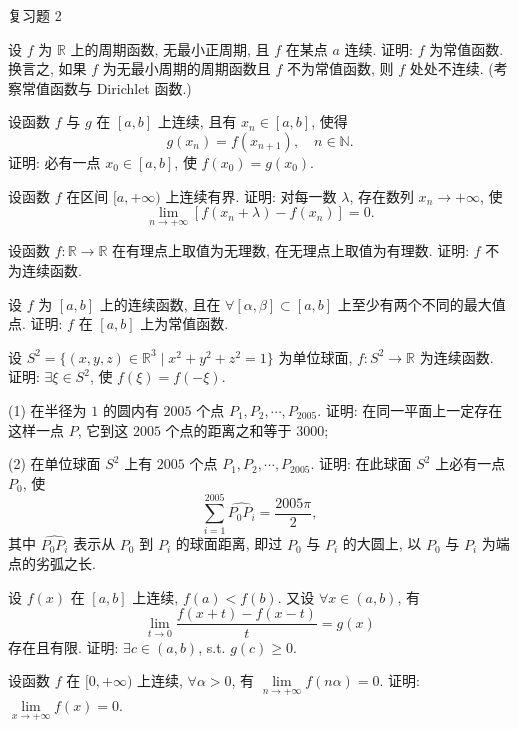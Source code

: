\begin{exblock}{复习题 2}
    \item 设 $f$ 为 $\mathbb{R}$ 上的周期函数, 无最小正周期, 且 $f$ 在某点 $a$ 连续. 证明: $f$ 为常值函数. 换言之, 如果 $f$ 为无最小周期的周期函数且 $f$ 不为常值函数, 则 $f$ 处处不连续. (考察常值函数与 Dirichlet 函数.)

    \item 设函数 $f$ 与 $g$ 在 $[a,b]$ 上连续, 且有 $x_n \in [a,b]$, 使得
    \[
    g(x_n) = f(x_{n+1}),\quad n \in \mathbb{N}.
\]
    证明: 必有一点 $x_0 \in [a,b]$, 使 $f(x_0) = g(x_0)$.

    \item 设函数 $f$ 在区间 $[a,+\infty)$ 上连续有界. 证明: 对每一数 $\lambda$, 存在数列 $x_n \to +\infty$, 使
    \[
    \lim_{n\to+\infty} [f(x_n + \lambda) - f(x_n)] = 0.
\]

    \item 设函数 $f: \mathbb{R} \to \mathbb{R}$ 在有理点上取值为无理数, 在无理点上取值为有理数. 证明: $f$ 不为连续函数.

    \item 设 $f$ 为 $[a,b]$ 上的连续函数, 且在 $\forall [\alpha,\beta] \subset [a,b]$ 上至少有两个不同的最大值点. 证明: $f$ 在 $[a,b]$ 上为常值函数.

    \item 设 $S^2 = \{(x,y,z) \in \mathbb{R}^3 \mid x^2 + y^2 + z^2 = 1\}$ 为单位球面, $f: S^2 \to \mathbb{R}$ 为连续函数. 证明: $\exists \xi \in S^2$, 使 $f(\xi) = f(-\xi)$.

    \item (1) 在半径为 $1$ 的圆内有 $2005$ 个点 $P_1, P_2, \cdots, P_{2005}$. 证明: 在同一平面上一定存在这样一点 $P$, 它到这 $2005$ 个点的距离之和等于 $3000$;

    (2) 在单位球面 $S^2$ 上有 $2005$ 个点 $P_1, P_2, \cdots, P_{2005}$. 证明: 在此球面 $S^2$ 上必有一点 $P_0$, 使
    \[
    \sum_{i=1}^{2005} \widehat{P_0 P_i} = \frac{2005\pi}{2},
\]
    其中 $\widehat{P_0 P_i}$ 表示从 $P_0$ 到 $P_i$ 的球面距离, 即过 $P_0$ 与 $P_i$ 的大圆上, 以 $P_0$ 与 $P_i$ 为端点的劣弧之长.

    \item 设 $f(x)$ 在 $[a,b]$ 上连续, $f(a) < f(b)$. 又设 $\forall x \in (a,b)$, 有
    \[
    \lim_{t\to0} \frac{f(x+t) - f(x-t)}{t} = g(x)
\]
    存在且有限. 证明: $\exists c \in (a,b)$, s.t. $g(c) \geqslant 0$.

    \item 设函数 $f$ 在 $[0,+\infty)$ 上连续, $\forall \alpha > 0$, 有 $\lim\limits_{n\to+\infty} f(n\alpha) = 0$. 证明: $\lim\limits_{x\to+\infty} f(x) = 0$.


\end{exblock}
